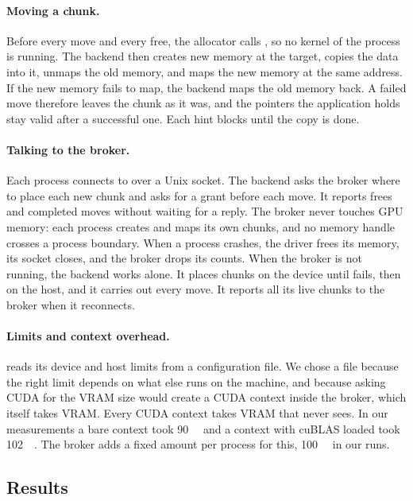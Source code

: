 \paragraph{Moving a chunk.} Before every move and every free, the allocator
calls , so no kernel of the process is running. The
backend then creates new memory at the target, copies the data into it, unmaps
the old memory, and maps the new memory at the same address. If the new
memory fails to map, the backend maps the old memory back. A failed move
therefore leaves the chunk as it was, and the pointers the application holds
stay valid after a successful one. Each hint blocks until the copy is done.

\paragraph{Talking to the broker.} Each process connects to \vmemd over a
Unix socket. The backend asks the broker where to place each new chunk and
asks for a grant before each move. It reports frees and completed moves
without waiting for a reply. The broker never touches GPU memory: each
process creates and maps its own chunks, and no memory handle crosses a
process boundary. When a process crashes, the driver frees its memory, its
socket closes, and the broker drops its counts. When the broker is not
running, the backend works alone. It places chunks on the device until
 fails, then on the host, and it carries out every move. It
reports all its live chunks to the broker when it reconnects.

\paragraph{Limits and context overhead.} \vmemd reads its device and host
limits from a configuration file. We chose a file because the right limit
depends on what else runs on the machine, and because asking CUDA for the
VRAM size would create a CUDA context inside the broker, which itself takes
VRAM. Every CUDA context takes VRAM that \libvmem never sees. In our
measurements a bare context took \SI{90}{\mebi\byte} and a context with cuBLAS
loaded took \SI{102}{\mebi\byte}. The broker adds a fixed amount per process
for this, \SI{100}{\mebi\byte} in our runs.

\subsection{Results}
\label{sec:lv-results}

